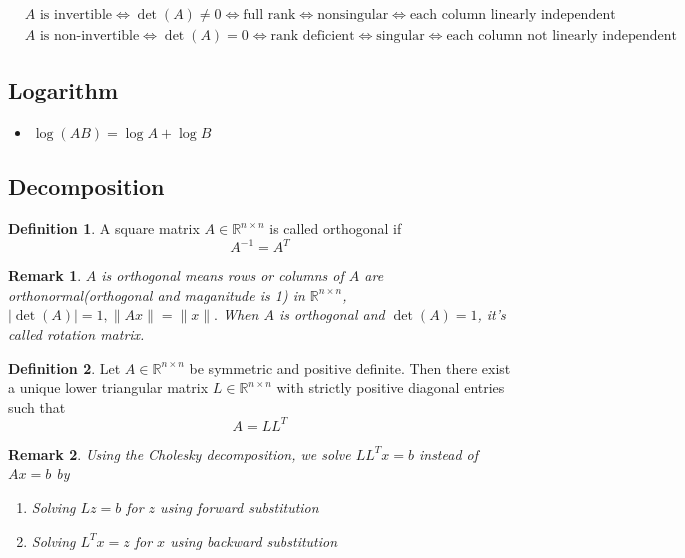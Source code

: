 \documentclass[a4paper]{article}
\theoremstyle{definition}
\newtheorem{definition}{Definition}
\theoremstyle{plain}
\newtheorem{remark}{Remark}
\begin{document}
\begin{align*}
    &A\text{ is invertible}\Leftrightarrow\operatorname{det}(A)\not=0\Leftrightarrow\text{full rank}\Leftrightarrow\text{nonsingular}\Leftrightarrow\text{each column linearly independent}\\
    &A\text{ is non-invertible}\Leftrightarrow\operatorname{det}(A)=0\Leftrightarrow\text{rank deficient}\Leftrightarrow\text{singular}\Leftrightarrow\text{each column not linearly independent}
\end{align*}

\subsection{Logarithm}
\begin{itemize}
    \item $\log(AB)=\log A+\log B$
\end{itemize}

\subsection{Decomposition}
\begin{definition}
 A square matrix $A\in\mathbb{R}^{n\times n}$ is called orthogonal if 
\begin{equation*}
    A^{-1}=A^T
\end{equation*}
\end{definition}

\begin{remark}
$A$ is orthogonal means rows or columns of $A$ are orthonormal(orthogonal and maganitude is 1) in $\mathbb{R}^{n\times n}$, $|\operatorname{det}(A)|=1, \|Ax\| = \|x\|.$ When $A$ is orthogonal and $\operatorname{det}(A)=1$, it's called rotation matrix.
\end{remark}

\begin{definition}
 Let $A\in\mathbb{R}^{n\times n}$ be symmetric and positive definite. Then there exist a unique lower triangular matrix $L\in\mathbb{R}^{n\times n}$ with strictly positive diagonal entries such that
\begin{equation*}
    A=LL^T
\end{equation*}
\end{definition}

\begin{remark}
Using the Cholesky decomposition, we solve $LL^Tx=b$ instead of $Ax=b$ by
\begin{enumerate}
    \item Solving $Lz=b$ for $z$ using forward substitution
    \item Solving $L^Tx=z$ for $x$ using backward substitution
\end{enumerate}
\end{remark}
\end{document}
